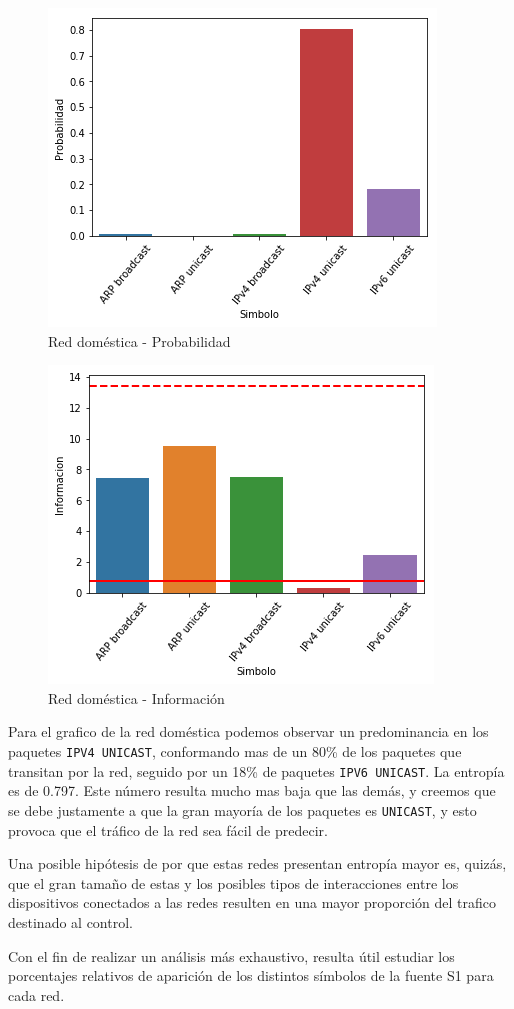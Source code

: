 \begin{figure}[H]
	\centering
	\includegraphics[width=.5\linewidth]{imagenes/manu_casa_barras_prob}
	\caption{Red doméstica - Probabilidad}
\end{figure}

\begin{figure}[H]
	\centering
	\includegraphics[width=.5\linewidth]{imagenes/manu_casa_barras_info}
	\caption{Red doméstica - Información}
\end{figure}

Para el grafico de la red doméstica podemos observar un predominancia en los paquetes \texttt{IPV4 UNICAST}, conformando mas de un 80\% de los paquetes que transitan por la red, seguido por un 18\% de paquetes \texttt{IPV6 UNICAST}. La entropía es de 0.797. Este número resulta mucho mas baja que las demás, y creemos que se debe justamente a que la gran mayoría de los paquetes es \texttt{UNICAST}, y esto provoca que el tráfico de la red sea fácil de predecir.

Una posible hipótesis de por que estas redes presentan entropía mayor es, quizás, que el gran tamaño de estas y los posibles tipos de interacciones entre los dispositivos conectados a las redes resulten en una mayor proporción del trafico destinado al control.



Con el fin de realizar un análisis más exhaustivo, resulta útil estudiar los porcentajes relativos de aparición de los distintos símbolos de la fuente S1 para cada red.

